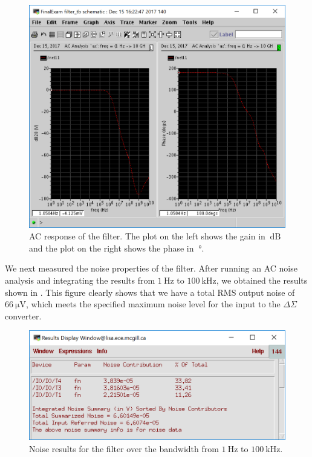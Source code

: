 \documentclass[journal,hidelinks]{IEEEtran}
\begin{document}
\begin{figure}[!htb]
  \centering
  \includegraphics[width=\columnwidth]{results/filter_ac.png}
  \caption{AC response of the filter. The plot on the left shows the gain in $\SI{}{\deci\bel}$ and the plot on the right shows the phase in $\SI{}{\degree}$.}
  \label{fig:filter_ac}
\end{figure}

We next measured the noise properties of the filter. After running an AC noise analysis and integrating the results from $\SI{1}{\hertz}$ to $\SI{100}{\kilo\hertz}$, we obtained the results shown in . This figure clearly shows that we have a total RMS output noise of $\SI{66}{\micro\volt}$, which meets the specified maximum noise level for the input to the $\Delta \Sigma$ converter.

\begin{figure}[!htb]
  \centering
  \includegraphics[width=\columnwidth]{results/filter_noise.png}
  \caption{Noise results for the filter over the bandwidth from $\SI{1}{\hertz}$ to $\SI{100}{\kilo\hertz}$.}
  \label{fig:filter_noise}
\end{figure}
\end{document}
